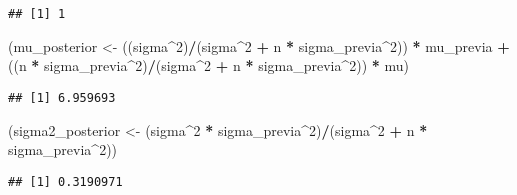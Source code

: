 \documentclass[
  12pt,
]{book}
\newenvironment{Shaded}{\begin{snugshade}}{\end{snugshade}}
\newcommand{\DecValTok}[1]{\textcolor[rgb]{0.00,0.00,0.81}{#1}}
\newcommand{\NormalTok}[1]{#1}
\newcommand{\OperatorTok}[1]{\textcolor[rgb]{0.81,0.36,0.00}{\textbf{#1}}}
\newcommand{\StringTok}[1]{\textcolor[rgb]{0.31,0.60,0.02}{#1}}
\begin{document}
\begin{verbatim}
## [1] 1
\end{verbatim}

\begin{Shaded}
\begin{Highlighting}[]
\NormalTok{(mu\_posterior \textless{}{-}}\StringTok{ }\NormalTok{((sigma}\OperatorTok{\^{}}\DecValTok{2}\NormalTok{)}\OperatorTok{/}\NormalTok{(sigma}\OperatorTok{\^{}}\DecValTok{2} \OperatorTok{+}\StringTok{ }\NormalTok{n }\OperatorTok{*}\StringTok{ }\NormalTok{sigma\_previa}\OperatorTok{\^{}}\DecValTok{2}\NormalTok{)) }\OperatorTok{*}\StringTok{ }
\StringTok{    }\NormalTok{mu\_previa }\OperatorTok{+}\StringTok{ }\NormalTok{((n }\OperatorTok{*}\StringTok{ }\NormalTok{sigma\_previa}\OperatorTok{\^{}}\DecValTok{2}\NormalTok{)}\OperatorTok{/}\NormalTok{(sigma}\OperatorTok{\^{}}\DecValTok{2} \OperatorTok{+}\StringTok{ }\NormalTok{n }\OperatorTok{*}\StringTok{ }
\StringTok{    }\NormalTok{sigma\_previa}\OperatorTok{\^{}}\DecValTok{2}\NormalTok{)) }\OperatorTok{*}\StringTok{ }\NormalTok{mu)}
\end{Highlighting}
\end{Shaded}

\begin{verbatim}
## [1] 6.959693
\end{verbatim}

\begin{Shaded}
\begin{Highlighting}[]
\NormalTok{(sigma2\_posterior \textless{}{-}}\StringTok{ }\NormalTok{(sigma}\OperatorTok{\^{}}\DecValTok{2} \OperatorTok{*}\StringTok{ }\NormalTok{sigma\_previa}\OperatorTok{\^{}}\DecValTok{2}\NormalTok{)}\OperatorTok{/}\NormalTok{(sigma}\OperatorTok{\^{}}\DecValTok{2} \OperatorTok{+}\StringTok{ }
\StringTok{    }\NormalTok{n }\OperatorTok{*}\StringTok{ }\NormalTok{sigma\_previa}\OperatorTok{\^{}}\DecValTok{2}\NormalTok{))}
\end{Highlighting}
\end{Shaded}

\begin{verbatim}
## [1] 0.3190971
\end{verbatim}
\end{document}
